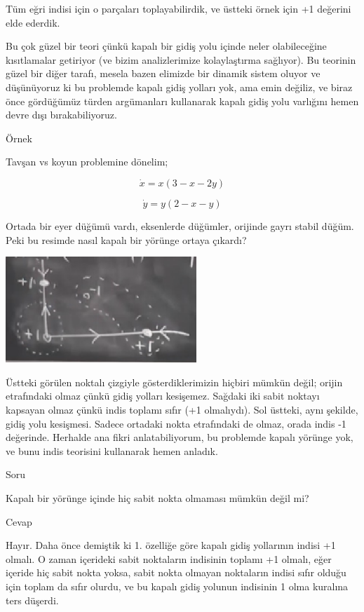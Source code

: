 \documentclass[12pt,fleqn]{article}\usepackage{../../common}
\begin{document}
Tüm eğri indisi için o parçaları toplayabilirdik, ve üstteki örnek için +1
değerini elde ederdik.

Bu çok güzel bir teori çünkü kapalı bir gidiş yolu içinde neler olabileceğine
kısıtlamalar getiriyor (ve bizim analizlerimize kolaylaştırma sağlıyor). Bu
teorinin güzel bir diğer tarafı, mesela bazen elimizde bir dinamik sistem oluyor
ve düşünüyoruz ki bu problemde kapalı gidiş yolları yok, ama emin değiliz, ve
biraz önce gördüğümüz türden argümanları kullanarak kapalı gidiş yolu varlığını
hemen devre dışı bırakabiliyoruz.

Örnek

Tavşan vs koyun problemine dönelim;

$$ \dot{x} = x(3 - x - 2y) $$

$$ \dot{y} = y(2-x-y) $$


Ortada bir eyer düğümü vardı, eksenlerde düğümler, orijinde gayrı stabil
düğüm. Peki bu resimde nasıl kapalı bir yörünge ortaya çıkardı? 

\includegraphics[height=4cm]{08_35.png}

Üstteki görülen noktalı çizgiyle gösterdiklerimizin hiçbiri mümkün değil; orijin
etrafındaki olmaz çünkü gidiş yolları kesişemez. Sağdaki iki sabit noktayı
kapsayan olmaz çünkü indis toplamı sıfır (+1 olmalıydı). Sol üstteki, aynı
şekilde, gidiş yolu kesişmesi. Sadece ortadaki nokta etrafındaki de olmaz, orada
indis -1 değerinde. Herhalde ana fikri anlatabiliyorum, bu problemde kapalı
yörünge yok, ve bunu indis teorisini kullanarak hemen anladık. 

Soru

Kapalı bir yörünge içinde hiç sabit nokta olmaması mümkün değil mi?

Cevap

Hayır. Daha önce demiştik ki 1. özelliğe göre kapalı gidiş yollarının indisi +1
olmalı. O zaman içerideki sabit noktaların indisinin toplamı +1 olmalı, eğer
içeride hiç sabit nokta yoksa, sabit nokta olmayan noktaların indisi sıfır
olduğu için toplam da sıfır olurdu, ve bu kapalı gidiş yolunun indisinin 1 olma
kuralına ters düşerdi. 
\end{document}
